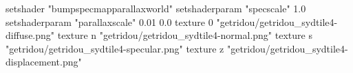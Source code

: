 setshader "bumpspecmapparallaxworld"
setshaderparam "specscale" 1.0
setshaderparam "parallaxscale" 0.01 0.0
texture 0 "getridou/getridou_sydtile4-diffuse.png"
texture n "getridou/getridou_sydtile4-normal.png"
texture s "getridou/getridou_sydtile4-specular.png"
texture z "getridou/getridou_sydtile4-displacement.png"
